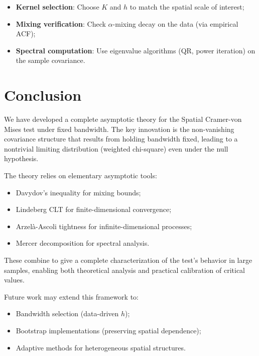 \documentclass[12pt]{article}
\theoremstyle{plain}
\theoremstyle{definition}
\newcommand{\1}[1]{\mathbf{1}_{#1}}
\begin{document}
\begin{itemize}
\item \textbf{Kernel selection}: Choose $K$ and $h$ to match the spatial scale of interest;

\item \textbf{Mixing verification}: Check $\alpha$-mixing decay on the data (via empirical ACF);

\item \textbf{Spectral computation}: Use eigenvalue algorithms (QR, power iteration) on the sample covariance.
\end{itemize}

\section{Conclusion}

We have developed a complete asymptotic theory for the Spatial Cramer-von Mises test under fixed bandwidth. The key innovation is the non-vanishing covariance structure that results from holding bandwidth fixed, leading to a nontrivial limiting distribution (weighted chi-square) even under the null hypothesis.

The theory relies on elementary asymptotic tools:
\begin{itemize}
\item Davydov's inequality for mixing bounds;
\item Lindeberg CLT for finite-dimensional convergence;
\item Arzelà-Ascoli tightness for infinite-dimensional processes;
\item Mercer decomposition for spectral analysis.
\end{itemize}

These combine to give a complete characterization of the test's behavior in large samples, enabling both theoretical analysis and practical calibration of critical values.

Future work may extend this framework to:
\begin{itemize}
\item Bandwidth selection (data-driven $h$);
\item Bootstrap implementations (preserving spatial dependence);
\item Adaptive methods for heterogeneous spatial structures.
\end{itemize}
\end{document}
